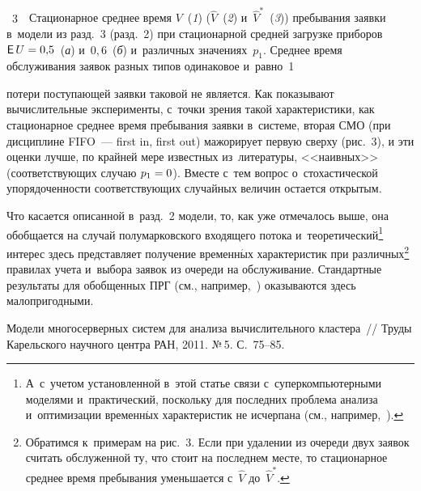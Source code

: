 \begin{multicols}{2}
{ \begin{center}  %
 \vspace*{-3pt}
    \mbox{%
\epsfxsize=79.483mm 
}

\end{center}

\vspace*{-4pt}

\noindent
{{\figurename~3}\ \ \small{Стационарное среднее время $V$~(\textit{1}) ($\hat V$~(\textit{2}) и~${\hat V}^*$~(\textit{3})) пребывания 
заявки в~модели из разд.~3 (разд.~2) при стационарной средней загрузке 
приборов ${\mathsf{E}\,U\hm=0{,}5}$~(\textit{а}) и~$0{,}6$~(\textit{б}) и~различных 
значениях~$p_1$. Среднее время обслуживания заявок разных типов одинаковое и~равно~1
}}}

\vspace*{12pt}

\noindent
 потери поступающей заявки таковой
не является.
  Как показывают вычислительные эксперименты, с~точки зрения такой характеристики,
как стационарное среднее время пребывания заявки в~сис\-те\-ме,
вторая СМО (при дисциплине FIFO~--- first in, first out) мажорирует первую сверху (рис.~3),
и эти оценки лучше, по край\-ней мере известных из~литературы,
<<наивных>> (со\-от\-вет\-ст\-ву\-ющих случаю ${p_1\hm=0}$). Вместе с~тем вопрос
о~стохастической упо\-ря\-до\-чен\-ности со\-от\-вет\-ст\-ву\-ющих случайных
величин остается открытым.




Что касается описанной в~разд.~2 модели, то, как уже
отмечалось выше, она обобщается на случай полумарковского входящего потока
и~теоретический\footnote[4]{А~с~учетом установленной в~этой статье связи
с~суперкомпьютерными моделями и~практический, поскольку
для последних проблема анализа и~оптимизации
временн$\acute{\mbox{ы}}$х характеристик не исчерпана
(см., например,~\cite{lg1}).}
интерес здесь представляет получение временн$\acute{\mbox{ы}}$х
характеристик при различных\footnote[1]{Обратимся к~примерам на рис.~3.
Если при удалении из очереди двух заявок считать обслуженной
ту, что стоит на последнем месте, то стационарное среднее время пребывания
уменьшается с~$\hat V$ до~${\hat V}^*$.} правилах
учета и~выбора заявок из очереди на обслуживание. Стандартные результаты
для обобщенных ПРГ (см., например,~\cite{ozawa06}) оказываются здесь ма\-ло\-при\-год\-ными.




{\small\frenchspacing
 { \baselineskip=11.5pt
 \begin{thebibliography}{99}
 Модели многосерверных систем для анализа 
вычислительного
кластера~// Труды Карельского научного центра РАН, 2011. №\,5. С.~75--85.


\end{thebibliography}}}
\end{multicols}
